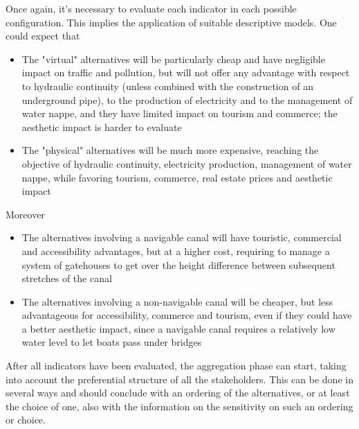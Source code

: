 Once again, it's necessary to evaluate each indicator in each possible configuration. This implies the application of suitable descriptive models. One could expect that
\begin{itemize}
	\item The "virtual" alternatives will be particularly cheap and have negligible impact on traffic and pollution, but will not offer any advantage with respect to hydraulic continuity (unless combined with the construction of an underground pipe), to the production of electricity and to the management of water nappe, and they have limited impact on tourism and commerce; the aesthetic impact is harder to evaluate
	
	\item The "physical" alternatives will be much more expensive, reaching the objective of hydraulic continuity, electricity production, management of water nappe, while favoring tourism, commerce, real estate prices and aesthetic impact
\end{itemize}

Moreover
\begin{itemize}
	\item The alternatives involving a navigable canal will have touristic, commercial and accessibility advantages, but at a higher cost, requiring to manage a system of gatehouses to get over the height difference between subsequent stretches of the canal
	
	\item The alternatives involving a non-navigable canal will be cheaper, but less advantageous for accessibility, commerce and tourism, even if they could have a better aesthetic impact, since a navigable canal requires a relatively low water level to let boats pass under bridges
\end{itemize}

After all indicators have been evaluated, the aggregation phase can start, taking into account the preferential structure of all the stakeholders. This can be done in several ways and should conclude with an ordering of the alternatives, or at least the choice of one, also with the information on the sensitivity on such an ordering or choice.

